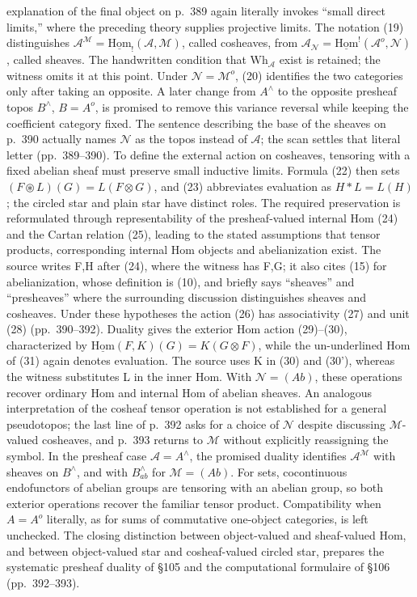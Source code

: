 \documentclass[10pt,oneside]{book}
\begin{document}
explanation of the final object on p.\ 389 again literally invokes ``small direct limits,'' where the preceding theory supplies projective limits. The notation (19) distinguishes $\mathcal A^{\mathcal M}=\underline{\mathrm{Hom}}_!(\mathcal A,\mathcal M)$, called cosheaves, from $\mathcal A_{\mathcal N}=\underline{\mathrm{Hom}}^!(\mathcal A^o,\mathcal N)$, called sheaves. The handwritten condition that $\mathrm{Wh}_{\mathcal A}$ exist is retained; the witness omits it at this point. Under $\mathcal N=\mathcal M^o$, (20) identifies the two categories only after taking an opposite. A later change from $A^\wedge$ to the opposite presheaf topos $B^\wedge$, $B=A^o$, is promised to remove this variance reversal while keeping the coefficient category fixed. The sentence describing the base of the sheaves on p.\ 390 actually names $\mathcal N$ as the topos instead of $\mathcal A$; the scan settles that literal letter (pp.\ 389--390). To define the external action on cosheaves, tensoring with a fixed abelian sheaf must preserve small inductive limits. Formula (22) then sets $(F\circledast L)(G)=L(F\otimes G)$, and (23) abbreviates evaluation as $H*L=L(H)$; the circled star and plain star have distinct roles. The required preservation is reformulated through representability of the presheaf-valued internal Hom (24) and the Cartan relation (25), leading to the stated assumptions that tensor products, corresponding internal Hom objects and abelianization exist. The source writes F,H after (24), where the witness has F,G; it also cites (15) for abelianization, whose definition is (10), and briefly says ``sheaves'' and ``presheaves'' where the surrounding discussion distinguishes sheaves and cosheaves. Under these hypotheses the action (26) has associativity (27) and unit (28) (pp.\ 390--392). Duality gives the exterior Hom action (29)--(30), characterized by $\underline{\mathrm{Hom}}(F,K)(G)=K(G\otimes F)$, while the un-underlined Hom of (31) again denotes evaluation. The source uses K in (30) and (30'), whereas the witness substitutes L in the inner Hom. With $\mathcal N=(Ab)$, these operations recover ordinary Hom and internal Hom of abelian sheaves. An analogous interpretation of the cosheaf tensor operation is not established for a general pseudotopos; the last line of p.\ 392 asks for a choice of $\mathcal N$ despite discussing $\mathcal M$-valued cosheaves, and p.\ 393 returns to $\mathcal M$ without explicitly reassigning the symbol. In the presheaf case $\mathcal A=A^\wedge$, the promised duality identifies $\mathcal A^{\mathcal M}$ with sheaves on $B^\wedge$, and with $B^\wedge_{ab}$ for $\mathcal M=(Ab)$. For sets, cocontinuous endofunctors of abelian groups are tensoring with an abelian group, so both exterior operations recover the familiar tensor product. Compatibility when $A=A^o$ literally, as for sums of commutative one-object categories, is left unchecked. The closing distinction between object-valued and sheaf-valued Hom, and between object-valued star and cosheaf-valued circled star, prepares the systematic presheaf duality of \S105 and the computational formulaire of \S106 (pp.\ 392--393).
\end{document}
